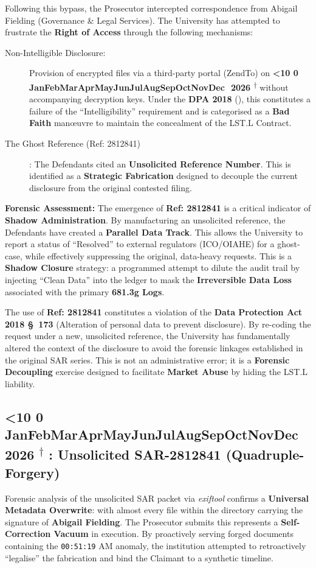 \documentclass{EMBASSY}
\DeclareRobustCommand{\gmt}[3]{%
    \texorpdfstring{%
        {\color{DateGold}\textbf{%
            \ifnum#1<10 0\fi#1\,\textperiodcentered\,%
            \ifcase#2\or Jan\or Feb\or Mar\or Apr\or May\or Jun\or Jul\or Aug\or Sep\or Oct\or Nov\or Dec\fi
            \,\textperiodcentered\,20#3%
            \textsuperscript{$\dagger$}%
        }}%
    }{%
        (#1/#2/#3)%
    }%
}
\begin{document}
Following this bypass, the Prosecutor intercepted correspondence from Abigail Fielding (Governance \& Legal Services). The University has attempted to frustrate the \textbf{Right of Access} through the following mechanisms:

\begin{description}
	\item[Non-Intelligible Disclosure:] Provision of encrypted files via a third-party portal (ZendTo) on \gmt{13}{3}{26} without accompanying decryption keys. Under the \textbf{DPA 2018} (\cite{DPA18}), this constitutes a failure of the ``Intelligibility'' requirement and is categorised as a \textbf{Bad Faith} man\oe uvre to maintain the concealment of the LST.L Contract.
	\item[The Ghost Reference (Ref: 2812841)]: The Defendants cited an \textbf{Unsolicited Reference Number}. This is identified as a \textbf{Strategic Fabrication} designed to decouple the current disclosure from the original contested filing.
\end{description}

\noindent\textbf{Forensic Assessment:} The emergence of \textbf{Ref: 2812841} is a critical indicator of \textbf{Shadow Administration}. By manufacturing an unsolicited reference, the Defendants have created a \textbf{Parallel Data Track}. This allows the University to report a status of ``Resolved'' to external regulators (ICO/OIAHE) for a ghost-case, while effectively suppressing the original, data-heavy requests. This is a \textbf{Shadow Closure} strategy: a programmed attempt to dilute the audit trail by injecting ``Clean Data'' into the ledger to mask the \textbf{Irreversible Data Loss} associated with the primary \textbf{681.3g Logs}.

The use of \textbf{Ref: 2812841} constitutes a violation of the \textbf{Data Protection Act 2018 \S~173} (Alteration of personal data to prevent disclosure). By re-coding the request under a new, unsolicited reference, the University has fundamentally altered the context of the disclosure to avoid the forensic linkages established in the original SAR series. This is not an administrative error; it is a \textbf{Forensic Decoupling} exercise designed to facilitate \textbf{Market Abuse} by hiding the LST.L liability.

\subsection{\gmt{16}{3}{26}: Unsolicited SAR-2812841 (Quadruple-Forgery)}
Forensic analysis of the unsolicited SAR packet via \textit{exiftool} confirms a \textbf{Universal Metadata Overwrite}: with almost every file within the directory carrying the signature of \textbf{Abigail Fielding}. The Prosecutor submits this represents a \textbf{Self-Correction Vacuum} in execution. By proactively serving forged documents containing the \texttt{00:51:19} AM anomaly, the institution attempted to retroactively ``legalise'' the fabrication and bind the Claimant to a synthetic timeline.
\end{document}
